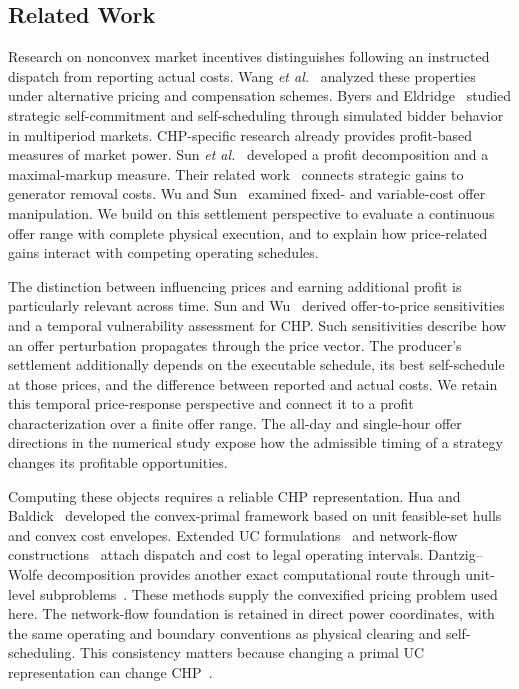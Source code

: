 \documentclass[journal]{IEEEtran}
\begin{document}
\subsection{Related Work}
Research on nonconvex market incentives distinguishes following an instructed dispatch from reporting actual costs. Wang \emph{et al.}~\cite{wang2023incentive} analyzed these properties under alternative pricing and compensation schemes. Byers and Eldridge~\cite{byers2022auction} studied strategic self-commitment and self-scheduling through simulated bidder behavior in multiperiod markets. CHP-specific research already provides profit-based measures of market power. Sun \emph{et al.}~\cite{sun2021strategic} developed a profit decomposition and a maximal-markup measure. Their related work~\cite{sun2020market} connects strategic gains to generator removal costs. Wu and Sun~\cite{wu2021potential} examined fixed- and variable-cost offer manipulation. We build on this settlement perspective to evaluate a continuous offer range with complete physical execution, and to explain how price-related gains interact with competing operating schedules.

The distinction between influencing prices and earning additional profit is particularly relevant across time. Sun and Wu~\cite{sun2021temporal} derived offer-to-price sensitivities and a temporal vulnerability assessment for CHP. Such sensitivities describe how an offer perturbation propagates through the price vector. The producer's settlement additionally depends on the executable schedule, its best self-schedule at those prices, and the difference between reported and actual costs. We retain this temporal price-response perspective and connect it to a profit characterization over a finite offer range. The all-day and single-hour offer directions in the numerical study expose how the admissible timing of a strategy changes its profitable opportunities.

Computing these objects requires a reliable CHP representation. Hua and Baldick~\cite{hua2017} developed the convex-primal framework based on unit feasible-set hulls and convex cost envelopes. Extended UC formulations~\cite{pan2018,yu2019} and network-flow constructions~\cite{networkflow} attach dispatch and cost to legal operating intervals. Dantzig--Wolfe decomposition provides another exact computational route through unit-level subproblems~\cite{andrianesis2022dw}. These methods supply the convexified pricing problem used here. The network-flow foundation is retained in direct power coordinates, with the same operating and boundary conventions as physical clearing and self-scheduling. This consistency matters because changing a primal UC representation can change CHP~\cite{zhao2023dependence}.
\end{document}
